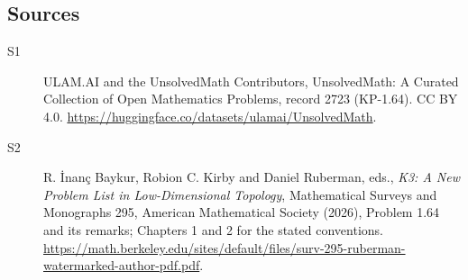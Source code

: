 \documentclass[11pt]{article}
\begin{document}
\subsection{Sources}
\begin{description}
\item[\hypertarget{source:2723:1}{S1}] ULAM.AI and the UnsolvedMath Contributors, UnsolvedMath: A Curated Collection of Open Mathematics Problems, record 2723 (KP-1.64). CC BY 4.0. \url{https://huggingface.co/datasets/ulamai/UnsolvedMath}.
\item[\hypertarget{source:2723:2}{S2}] R. İnanç Baykur, Robion C. Kirby and Daniel Ruberman, eds., \emph{K3: A New Problem List in Low-Dimensional Topology}, Mathematical Surveys and Monographs 295, American Mathematical Society (2026), Problem 1.64 and its remarks; Chapters 1 and 2 for the stated conventions. \url{https://math.berkeley.edu/sites/default/files/surv-295-ruberman-watermarked-author-pdf.pdf}.
\end{description}
\label{end:2723}
\end{document}
